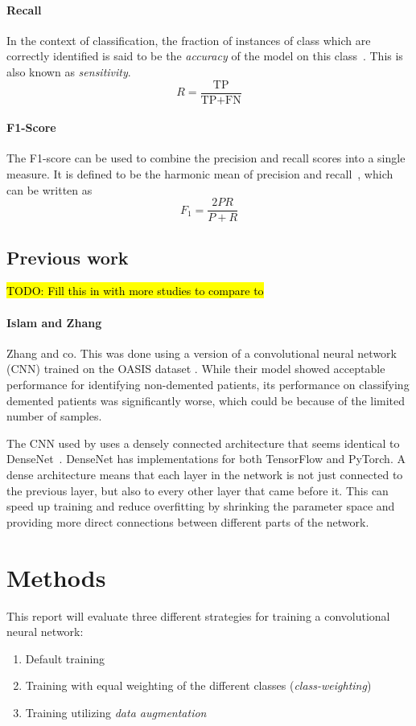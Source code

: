 \documentclass{kththesis}
\begin{document}
\subsubsection{Recall}
In the context of classification, the fraction of instances of class which are correctly identified is said to be the \textit{accuracy} of the model on this class~\cite[p.~5]{irbook}. This is also known as \textit{sensitivity}.
\[ R = \frac{\text{TP}}{\text{TP} + \text{FN}} \]

\subsubsection{F1-Score}
The F1-score can be used to combine the precision and recall scores into a single measure. It is defined to be the harmonic mean of precision and recall~\cite[p.~156-167]{irbook}, which can be written as
\[ F_1 = \frac{2PR}{P + R} \]

\section{Previous work}
\hl{TODO: Fill this in with more studies to compare to}
\subsubsection{Islam and Zhang}
Zhang and co.
This was done using a version of a convolutional neural network (CNN) trained on the OASIS dataset \parencite{oasis}. While their model showed acceptable performance for identifying non-demented patients, its performance on classifying demented patients was significantly worse, which could be because of the limited number of samples.

The CNN used by \textcite{islam2018early} uses a densely connected architecture that seems identical to DenseNet~\cite{huang2017densely}. DenseNet has implementations for both TensorFlow and PyTorch. A dense architecture means that each layer in the network is not just connected to the previous layer, but also to every other layer that came before it. This can speed up training and reduce overfitting by shrinking the parameter space and providing more direct connections between different parts of the network.

\chapter{Methods}
This report will evaluate three different strategies for training a convolutional neural network:
\begin{enumerate}
  \item Default training
  \item Training with equal weighting of the different classes (\textit{class-weighting})
  \item Training utilizing \textit{data augmentation}
\end{enumerate}
\end{document}
